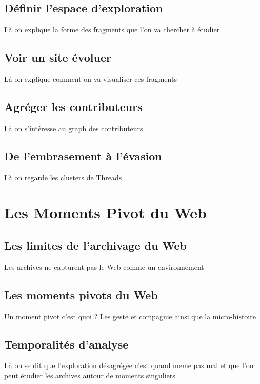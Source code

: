 \documentclass[symmetric,justified,marginals=raggedouter]{tufte-book}
\begin{document}
\subsection{Définir l'espace d'exploration}

Là on explique la forme des fragments que l'on va chercher à étudier

\subsection{Voir un site évoluer}

Là on explique comment on va visualiser ces fragments

\subsection{Agréger les contributeurs}

Là on s'intéresse au graph des contributeurs

\subsection{De l'embrasement à l'évasion}

Là on regarde les clusters de Threads

\section{Les Moments Pivot du Web}

\subsection{Les limites de l'archivage du Web}

Les archives ne capturent pas le Web comme un environnement

\subsection{Les moments pivots du Web}

Un moment pivot c'est quoi ? Les geste et compagnie ainsi que la micro-histoire

\subsection{Temporalités d'analyse}

Là on se dit que l'exploration désagrégée c'est quand meme pas mal et que l'on peut étudier les archives autour de moments singuliers
\end{document}
